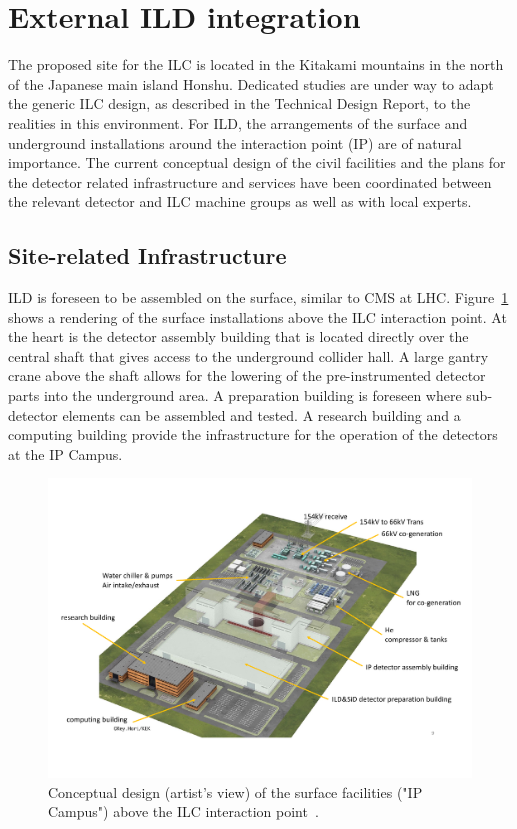 \section{External ILD integration}
\label{ild:sec:external_integration}

The proposed site for the ILC is located in the Kitakami mountains in the north of the Japanese main island Honshu. Dedicated studies are under way to adapt the generic ILC design, as described in the Technical Design Report, to the realities in this environment. For ILD, the arrangements of the surface and underground installations around the interaction point (IP) are of natural importance. The current conceptual design of the civil facilities and the plans for the detector related infrastructure and services have been coordinated between the relevant detector and ILC machine groups as well as with local experts.

\subsection{Site-related Infrastructure}

ILD is foreseen to be assembled on the surface, similar to CMS at LHC. Figure~\ref{fig:integration:surface} shows a rendering of the surface installations above the ILC interaction point. At the heart is the detector assembly building that is located directly over the central shaft that gives access to the underground collider hall. A large gantry crane above the shaft allows for the lowering of the pre-instrumented detector parts into the underground area. A preparation building is foreseen where sub-detector elements can be assembled and tested. A research building and a computing building provide the infrastructure for the operation of the detectors at the IP Campus. 

\begin{figure}[h!]
\includegraphics[width=1.1\hsize]{Integration/fig/Surface_Facilities.pdf}
\caption{\label{fig:integration:surface}Conceptual design (artist's view) of the surface facilities ("IP Campus") above the ILC interaction point~\cite{ild:bib:surface_facilities}. }
\end{figure}

